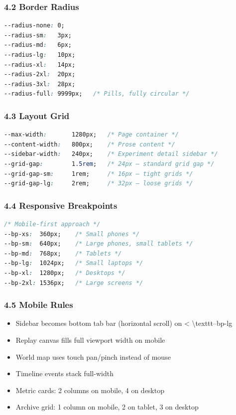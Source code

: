 \documentclass[11pt,a4paper]{article}
\begin{document}
\subsubsection*{4.2 Border Radius}

\begin{lstlisting}[language=css]
--radius-none: 0;
--radius-sm:   3px;
--radius-md:   6px;
--radius-lg:   10px;
--radius-xl:   14px;
--radius-2xl:  20px;
--radius-3xl:  28px;
--radius-full: 9999px;   /* Pills, fully circular */
\end{lstlisting}

\subsubsection*{4.3 Layout Grid}

\begin{lstlisting}[language=css]
--max-width:       1280px;   /* Page container */
--content-width:   800px;    /* Prose content */
--sidebar-width:   240px;    /* Experiment detail sidebar */
--grid-gap:        1.5rem;   /* 24px — standard grid gap */
--grid-gap-sm:     1rem;     /* 16px — tight grids */
--grid-gap-lg:     2rem;     /* 32px — loose grids */
\end{lstlisting}

\subsubsection*{4.4 Responsive Breakpoints}

\begin{lstlisting}[language=css]
/* Mobile-first approach */
--bp-xs:  360px;    /* Small phones */
--bp-sm:  640px;    /* Large phones, small tablets */
--bp-md:  768px;    /* Tablets */
--bp-lg:  1024px;   /* Small laptops */
--bp-xl:  1280px;   /* Desktops */
--bp-2xl: 1536px;   /* Large screens */
\end{lstlisting}

\subsubsection*{4.5 Mobile Rules}

\begin{itemize}
  \item Sidebar becomes bottom tab bar (horizontal scroll) on \textless{} \textbackslash{}texttt{--bp-lg}
  \item Replay canvas fills full viewport width on mobile
  \item World map uses touch pan/pinch instead of mouse
  \item Timeline events stack full-width
  \item Metric cards: 2 columns on mobile, 4 on desktop
  \item Archive grid: 1 column on mobile, 2 on tablet, 3 on desktop
\end{itemize}
\end{document}
